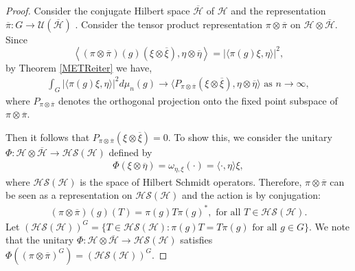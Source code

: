 \documentclass[11pt]{amsart}
\theoremstyle{definition}
\theoremstyle{myremark}
\numberwithin{equation}{section}
\newcommand{\CH}{\mathcal{H}}
\newcommand{\CS}{\mathcal{S}}
\newcommand{\CU}{\mathcal{U}}
\begin{document}
\begin{proof}
 Consider the conjugate Hilbert space $\overline{ \CH} $ of $\CH$ and the representation $ \overline{\pi} : G \to \CU(\overline{\CH})$ . Consider the tensor product representation
$\pi\otimes\overline{\pi}$ on $\mathcal{H}\otimes\overline{\mathcal{H}}$. Since
\[
\left\langle
(\pi\otimes\overline{\pi})(g)
(\xi\otimes\overline{\xi}),
\eta\otimes\overline{\eta}
\right\rangle
=
|\langle\pi(g)\xi,\eta\rangle|^2,
\]
by Theorem \ref{METReiter} we have,
\begin{align*}
    \int_{G}|\langle\pi(g)\xi,\eta\rangle|^2d\mu_{n}(g) \rightarrow\langle P_{\pi \otimes \overline{\pi}}(\xi \otimes \overline{\xi}),\eta \otimes \overline{\eta}\rangle \text{ as $n \rightarrow \infty$},
\end{align*}
where $P_{\pi \otimes \overline{\pi}}$ denotes the orthogonal projection onto the fixed point subspace of $\pi\otimes \overline{\pi}.$



\medskip
\noindent
Then it follows that  $P_{\pi \otimes \overline{\pi}}(\xi\otimes\overline{\xi})=0.$
To show this, we consider the unitary  $ \Phi:\CH \otimes \overline{\CH} \rightarrow \CH\CS(\CH)$ defined by 
\begin{align*}
\Phi(\xi \otimes \overline{\eta}) = \omega_{\eta,\xi}(\cdot)=\langle\cdot,\eta\rangle\xi,
\end{align*}
where $\CH \CS(\CH)$ is the space of Hilbert Schmidt operators.
Therefore, $\pi \otimes \overline{\pi}$ can be seen as a representation on $\CH \CS(\CH)$   and the action is by conjugation:
\begin{align*}
(\pi \otimes \overline{\pi})(g)(T)=\pi(g)T\pi(g)^{*}, \text{ for all } T \in \CH \CS(\CH).
\end{align*}
Let $(\CH \CS(\CH))^{G}=\{T \in \CH \CS(\CH): \pi(g)T=T\pi(g) \text{ for all $g \in G$}\}.$
We note that the unitary $\Phi:\CH \otimes\overline{\CH} \rightarrow\CH\CS(\CH)$ satisfies $\Phi((\pi \otimes \overline{\pi})^{G})=(\CH \CS(\CH))^{G}$.


\end{proof}
\end{document}
